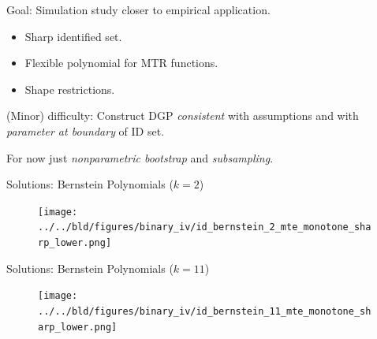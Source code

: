 \documentclass[11pt, aspectratio=169]{beamer}
\begin{document}
\begin{frame}
    Goal: Simulation study closer to empirical application.

    \vspace{0.5cm}

    \begin{itemize}
        \item Sharp identified set.
        \item Flexible polynomial for MTR functions.
        \item Shape restrictions.
    \end{itemize}

    \pause

    \vspace{0.5cm}

    (Minor) difficulty: Construct DGP \textit{consistent} with assumptions and with \textit{parameter at boundary} of ID set.

    \vspace{0.5cm}

    For now just \textit{nonparametric bootstrap} and \textit{subsampling}.

\end{frame}

\begin{frame}{Solutions: Bernstein Polynomials ($k=2$)}

    \begin{figure}
        \centering
        \texttt{[image: ../../bld/figures/binary\_iv/id\_bernstein\_2\_mte\_monotone\_sharp\_lower.png]}
    \end{figure}


\end{frame}

\begin{frame}{Solutions: Bernstein Polynomials ($k=11$)}

    \begin{figure}
        \centering
        \texttt{[image: ../../bld/figures/binary\_iv/id\_bernstein\_11\_mte\_monotone\_sharp\_lower.png]}
    \end{figure}


\end{frame}




\end{document}
